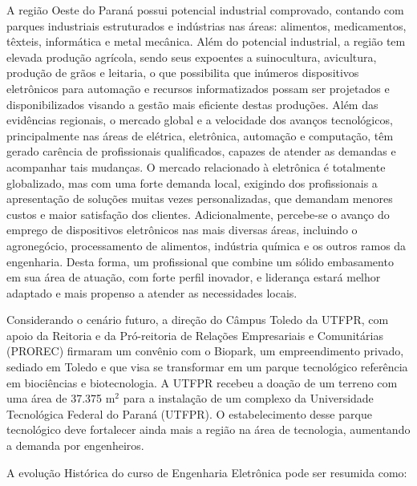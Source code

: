 
A região Oeste do Paraná possui potencial industrial comprovado, contando com parques industriais estruturados e indústrias nas áreas: alimentos, medicamentos, têxteis, informática e metal mecânica. Além do potencial industrial, a região tem elevada produção agrícola, sendo seus expoentes a suinocultura, avicultura, produção de grãos e leitaria, o que possibilita que inúmeros dispositivos eletrônicos para automação e recursos informatizados possam ser projetados e disponibilizados visando a gestão mais eficiente destas produções. Além das evidências regionais, o mercado global e a velocidade dos avanços tecnológicos, principalmente nas áreas de elétrica, eletrônica, automação e computação, têm gerado carência de profissionais qualificados, capazes de atender as demandas e acompanhar tais mudanças. O mercado relacionado à eletrônica é totalmente globalizado, mas com uma forte demanda local, exigindo dos profissionais a apresentação de soluções muitas vezes personalizadas, que demandam menores custos e maior satisfação dos clientes. Adicionalmente, percebe-se o avanço do emprego de dispositivos eletrônicos nas mais diversas áreas, incluindo o agronegócio, processamento de alimentos, indústria química e os outros ramos da engenharia. Desta forma, um profissional que combine um sólido embasamento em sua área de atuação, com forte perfil inovador, e liderança estará melhor adaptado e mais propenso a atender as necessidades locais.

Considerando o cenário futuro, a direção do Câmpus Toledo da UTFPR, com apoio da Reitoria e da Pró-reitoria de Relações Empresariais e Comunitárias (PROREC) firmaram um convênio com o Biopark, um empreendimento privado, sediado em Toledo e que visa se transformar em um parque tecnológico referência em biociências e biotecnologia. A UTFPR recebeu a doação de um terreno com uma área de 37.375 m$^2$ para a instalação de um complexo da Universidade Tecnológica Federal do Paraná (UTFPR). O estabelecimento desse parque tecnológico deve fortalecer ainda mais a região na área de tecnologia, aumentando a demanda por engenheiros. 


A evolução Histórica do curso de Engenharia Eletrônica pode ser resumida como:

